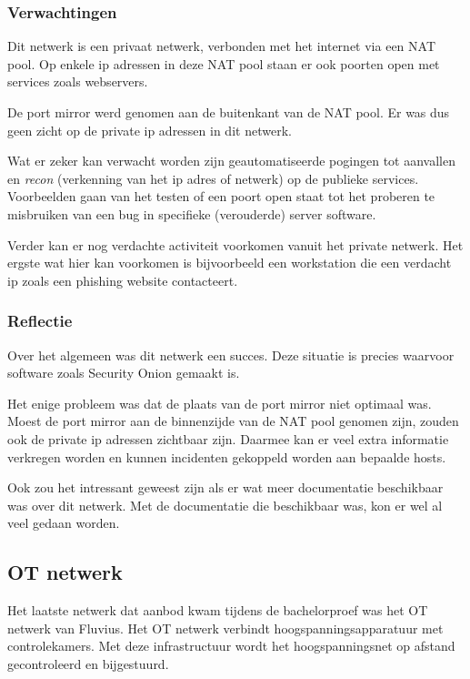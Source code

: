 \documentclass[a4paper,12pt]{report}
\begin{document}
\subsubsection{Verwachtingen}
Dit netwerk is een privaat netwerk, verbonden met het internet via een NAT pool.
Op enkele ip adressen in deze NAT pool staan er ook poorten open met services zoals webservers.

De port mirror werd genomen aan de buitenkant van de NAT pool.
Er was dus geen zicht op de private ip adressen in dit netwerk.

Wat er zeker kan verwacht worden zijn geautomatiseerde pogingen tot aanvallen en \emph{recon} (verkenning van het ip adres of netwerk) op de publieke services.
Voorbeelden gaan van het testen of een poort open staat tot het proberen te misbruiken van een bug in specifieke (verouderde) server software.

Verder kan er nog verdachte activiteit voorkomen vanuit het private netwerk.
Het ergste wat hier kan voorkomen is bijvoorbeeld een workstation die een verdacht ip zoals een phishing website contacteert.


\subsubsection{Reflectie}

Over het algemeen was dit netwerk een succes.
Deze situatie is precies waarvoor software zoals Security Onion gemaakt is.

Het enige probleem was dat de plaats van de port mirror niet optimaal was.
Moest de port mirror aan de binnenzijde van de NAT pool genomen zijn, zouden ook de private ip adressen zichtbaar zijn.
Daarmee kan er veel extra informatie verkregen worden en kunnen incidenten gekoppeld worden aan bepaalde hosts.

Ook zou het intressant geweest zijn als er wat meer documentatie beschikbaar was over dit netwerk.
Met de documentatie die beschikbaar was, kon er wel al veel gedaan worden.

\subsection{OT netwerk}
\label{sec:ot-netwerk}
Het laatste netwerk dat aanbod kwam tijdens de bachelorproef was het OT netwerk van Fluvius.
Het OT netwerk verbindt hoogspanningsapparatuur met controlekamers.
Met deze infrastructuur wordt het hoogspanningsnet op afstand gecontroleerd en bijgestuurd.
\end{document}
